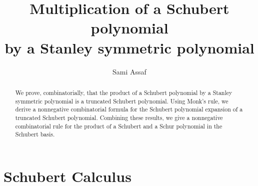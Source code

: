 \documentclass[11pt]{amsart}
\theoremstyle{definition}
\theoremstyle{remark}
\numberwithin{equation}{section}
\begin{document}

\title[Schubert polynomials times Stanley polynomials]{Multiplication of a Schubert polynomial \\ by a Stanley symmetric polynomial}  

\author{Sami Assaf}
\address{Department of Mathematics, University of Southern California, Los Angeles, CA 90089}







\begin{abstract}
  We prove, combinatorially, that the product of a Schubert polynomial by a Stanley symmetric polynomial is a truncated Schubert polynomial. Using Monk's rule, we derive a nonnegative combinatorial formula for the Schubert polynomial expansion of a truncated Schubert polynomial. Combining these results, we give a nonnegative combinatorial rule for the product of a Schubert and a Schur polynomial in the Schubert basis.
\end{abstract}

\maketitle

%
\section{Schubert Calculus}
%
\label{sec:introduction}
\end{document}
